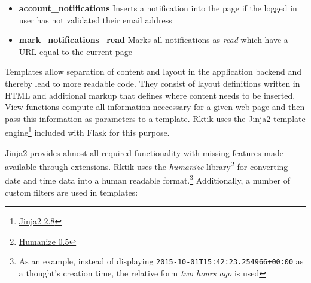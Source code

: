 \begin{itemize}
\tightlist
\item
  \textbf{account\_notifications} Inserts a notification into the page
  if the logged in user has not validated their email address
\item
  \textbf{mark\_notifications\_read} Marks all notifications as
  \emph{read} which have a URL equal to the current page
\end{itemize}


Templates allow separation of content and layout in the application
backend and thereby lead to more readable code. They consist of layout
definitions written in HTML and additional markup that defines where
content needs to be inserted. View functions compute all information
neccessary for a given web page and then pass this information as
parameters to a template. Rktik uses the Jinja2 template
engine\footnote{\href{https://pypi.python.org/pypi/Jinja2/2.8}{Jinja2
  2.8}} included with Flask for this purpose.

Jinja2 provides almost all required functionality with missing features
made available through extensions. Rktik uses the \emph{humanize}
library\footnote{\href{https://pypi.python.org/pypi/humanize/0.5}{Humanize
  0.5}} for converting date and time data into a human readable
format.\footnote{As an example, instead of displaying
  \texttt{2015-10-01T15:42:23.254966+00:00} as a thought's creation
  time, the relative form \emph{two hours ago} is used} Additionally, a
number of custom filters are used in templates:


